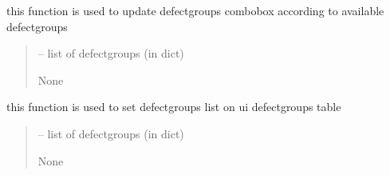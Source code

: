 \documentclass[letterpaper,10pt,english]{sphinxmanual}
\begin{document}
\begin{savenotes}\begin{fulllineitems}
\label{\detokenize{setting/backend/defect_management_funcs:oxin.backend.defect_management_funcs.set_defect_groups_on_combo}}
\pysigstartsignatures
{}
\pysigstopsignatures
\sphinxAtStartPar
this function is used to update defect\sphinxhyphen{}groups combobox according to available defect\sphinxhyphen{}groups
\begin{quote}\begin{description}
\sphinxAtStartPar
{} – list of defect\sphinxhyphen{}groups (in dict)

\sphinxAtStartPar
None

\end{description}\end{quote}

\end{fulllineitems}\end{savenotes}


\begin{savenotes}\begin{fulllineitems}
\label{\detokenize{setting/backend/defect_management_funcs:oxin.backend.defect_management_funcs.set_defect_groups_on_ui}}
\pysigstartsignatures
{}
\pysigstopsignatures
\sphinxAtStartPar
this function is used to set defect\sphinxhyphen{}groups list on ui defect\sphinxhyphen{}groups table
\begin{quote}\begin{description}
\sphinxAtStartPar
{} – list of defect\sphinxhyphen{}groups (in dict)

\sphinxAtStartPar
None

\end{description}\end{quote}

\end{fulllineitems}\end{savenotes}
\end{document}
